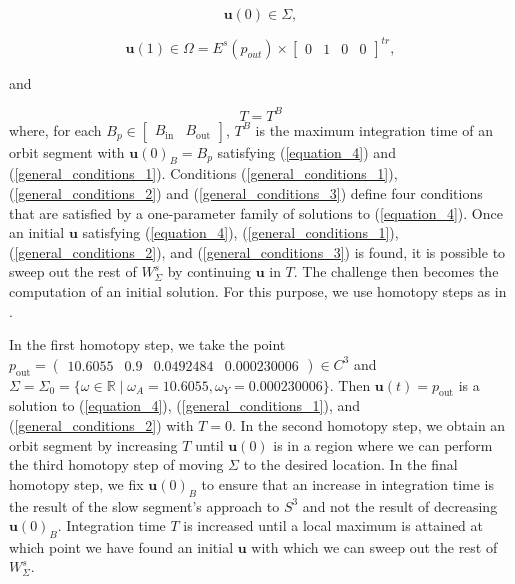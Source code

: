 \documentclass{ws-ijbc}
\begin{document}
 \begin{equation}
	\mathbf{u}(0) \in \Sigma,
	\label{general_conditions_1}
\end{equation}

\begin{equation}
	\mathbf{u}(1) \in \Omega = E^s(p_{out}) \times \begin{bmatrix} 0 & 1 & 0 & 0 \end{bmatrix}^{tr},
	\label{general_conditions_2}
\end{equation}

and

\begin{equation}
	T=T^{B}
	\label{general_conditions_3}
\end{equation}
where, for each $B_p \in \begin{bmatrix} B_{\text{in}} & B_{\text{out}} \end{bmatrix}$, $T^{B}$ is the maximum integration time of an orbit segment with $\mathbf{u}(0)_B=B_p$ satisfying (\ref{equation_4}) and (\ref{general_conditions_1}).  Conditions (\ref{general_conditions_1}), (\ref{general_conditions_2})  and (\ref{general_conditions_3}) define four conditions that are satisfied by a one-parameter family of solutions to (\ref{equation_4}).  Once an initial $\mathbf{u}$ satisfying (\ref{equation_4}), (\ref{general_conditions_1}), (\ref{general_conditions_2}), and (\ref{general_conditions_3}) is found, it is possible to sweep out the rest of $W^s_{\Sigma}$ by continuing $\mathbf{u}$ in $T$.  The challenge then becomes the computation of an initial solution.  For this purpose, we use homotopy steps as in  \cite{Saeed_Paper, homotopy_example}.

In the first homotopy step, we take the point $p_{\text{out}}=\begin{pmatrix} 10.6055 & 0.9 & 0.0492484 & 0.000230006 \end{pmatrix}  \in C^3$ and $\Sigma=\Sigma_0=\{\omega \in \mathbb{R} \; | \;  \omega_A=10.6055, \omega_Y=0.000230006\}$.  Then $\mathbf{u}(t)=p_{\text{out}}$ is a solution to (\ref{equation_4}), (\ref{general_conditions_1}), and (\ref{general_conditions_2}) with $T=0$.  In the second homotopy step, we obtain an orbit segment by increasing $T$ until $\mathbf{u}(0)$ is in a region where we can perform the third homotopy step of moving $\Sigma$ to the desired location.  In the final homotopy step, we fix $\mathbf{u}(0)_B$ to ensure that an increase in integration time is the result of the slow segment's approach to $S^3$ and not the result of decreasing $\mathbf{u}(0)_B$.  Integration time $T$ is increased until a local maximum is attained at which point we have found an initial $\mathbf{u}$ with which we can sweep out the rest of $W^s_\Sigma$.
\end{document}
